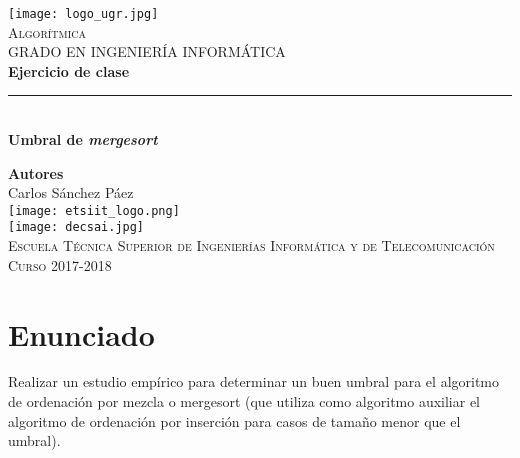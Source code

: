 \documentclass[12pt,spanish]{article}
\begin{document}
\begin{titlepage}

\newlength{\centeroffset}
\setlength{\centeroffset}{-0.5\oddsidemargin}
\addtolength{\centeroffset}{0.5\evensidemargin}
\thispagestyle{empty}

\noindent\hspace*{\centeroffset}
\begin{minipage}{\textwidth}

\centering
\texttt{[image: logo\_ugr.jpg]}\\[1.4cm]

\textsc{ \Large Algorítmica\\[0.2cm]}
\textsc{GRADO EN INGENIERÍA INFORMÁTICA}\\[1cm]

{\Huge\bfseries Ejercicio de clase\\}
\noindent\rule[-1ex]{\textwidth}{3pt}\\[3.5ex]
{\large\bfseries Umbral de \textit{mergesort}}
\end{minipage}

\vspace{1.5cm}
\noindent\hspace*{\centeroffset}
\begin{minipage}{\textwidth}
\centering

\textbf{Autores}\\ {Carlos Sánchez Páez}\\[2.5ex]
\texttt{[image: etsiit\_logo.png]}\\[0.1cm]
\vspace{1.5cm}
\texttt{[image: decsai.jpg]}\\[0.1cm]
\vspace{1cm}
\textsc{Escuela Técnica Superior de Ingenierías Informática y de Telecomunicación}\\
\vspace{1cm}
\textsc{Curso 2017-2018}
\end{minipage}
\end{titlepage}
\tableofcontents
\thispagestyle{empty}
\listoftables
\newpage
\setcounter{page}{1}

\section{Enunciado}
\large{Realizar un estudio empírico para determinar un buen umbral para el algoritmo de ordenación por mezcla o mergesort (que utiliza como algoritmo auxiliar el algoritmo de ordenación por inserción para casos de tamaño menor que el umbral).}
\end{document}
